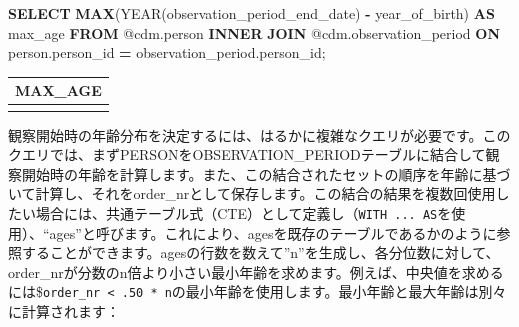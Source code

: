 \documentclass[
  11pt]{book}
\newenvironment{Shaded}{\begin{snugshade}}{\end{snugshade}}
\newcommand{\DataTypeTok}[1]{\textcolor[rgb]{0.13,0.29,0.53}{#1}}
\newcommand{\FunctionTok}[1]{\textcolor[rgb]{0.13,0.29,0.53}{\textbf{#1}}}
\newcommand{\KeywordTok}[1]{\textcolor[rgb]{0.13,0.29,0.53}{\textbf{#1}}}
\newcommand{\NormalTok}[1]{#1}
\newcommand{\OperatorTok}[1]{\textcolor[rgb]{0.81,0.36,0.00}{\textbf{#1}}}
\theoremstyle{definition}
\theoremstyle{definition}
\theoremstyle{definition}
\theoremstyle{definition}
\theoremstyle{remark}
\begin{document}
\begin{Shaded}
\begin{Highlighting}[]
\KeywordTok{SELECT} \FunctionTok{MAX}\NormalTok{(}\DataTypeTok{YEAR}\NormalTok{(observation\_period\_end\_date) }\OperatorTok{{-}}
\NormalTok{           year\_of\_birth) }\KeywordTok{AS}\NormalTok{ max\_age}
\KeywordTok{FROM}\NormalTok{ @cdm.person}
\KeywordTok{INNER} \KeywordTok{JOIN}\NormalTok{ @cdm.observation\_period}
  \KeywordTok{ON}\NormalTok{ person.person\_id }\OperatorTok{=}\NormalTok{ observation\_period.person\_id;}
\end{Highlighting}
\end{Shaded}

\begin{longtable}[]{@{}r@{}}
\toprule\noalign{}
MAX\_AGE \\
\midrule\noalign{}
\endhead
\bottomrule\noalign{}
\endlastfoot
90 \\
\end{longtable}

観察開始時の年齢分布を決定するには、はるかに複雑なクエリが必要です。このクエリでは、まずPERSONをOBSERVATION\_PERIODテーブルに結合して観察開始時の年齢を計算します。また、この結合されたセットの順序を年齢に基づいて計算し、それをorder\_nrとして保存します。この結合の結果を複数回使用したい場合には、共通テーブル式（CTE）として定義し（\texttt{WITH\ ...\ AS}を使用）、``ages''と呼びます。これにより、agesを既存のテーブルであるかのように参照することができます。agesの行数を数えて''n''を生成し、各分位数に対して、order\_nrが分数のn倍より小さい最小年齢を求めます。例えば、中央値を求めるには\$\texttt{order\_nr\ \textless{}\ .50\ *\ n}の最小年齢を使用します。最小年齢と最大年齢は別々に計算されます：
\end{document}
